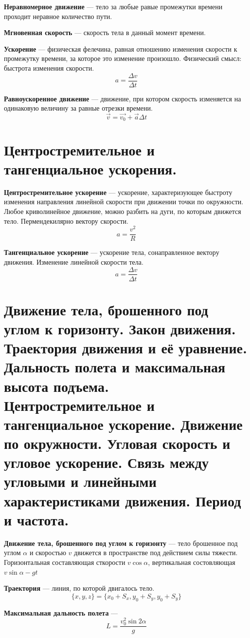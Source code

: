 \documentclass{report}
\begin{document}
{\bf Неравномерное движение} ---
тело за любые равые промежутки времени проходит неравное количество пути.

{\bf Мгновенная скорость} ---
скорость тела в данный момент времени.

{\bf Ускорение} ---
физическая фелечина, равная отношению изменения скорости к промежутку времени, за 
которое это изменение произошло.
Физический смысл: быстрота изменения скорости.
$$
a=\frac{\Delta v}{\Delta t}
$$

{\bf Равноускоренное движение} ---
движение, при котором скорость изменяется на одинаковую величину за равные отрезки времени.
$$
\vec{v}= \vec{v_0}+\vec{a} \Delta t
$$



\part{Центростремительное и тангенциальное ускорения.}

{\bf Центростремительное ускорение} ---
ускорение, характеризующее быстроту изменения направления линейной скорости при 
движении точки по окружности. Любое криволинейное движение, можно разбить на 
дуги, по которым движется тело.
Пермендекилярно вектору скорости.
$$
a=\frac{v^2}{R}
$$

{\bf Тангенциальное ускорение} ---
ускорение тела, сонаправленное вектору движения. Изменение линейной скорости тела.
$$
a=\frac{\Delta v}{\Delta t}
$$




\part{Движение тела, брошенного под углом к горизонту. 
Закон движения. 
Траектория движения и её уравнение. 
Дальность полета и максимальная высота подъема.
Центростремительное и тангенциальное ускорение. 
Движение по окружности. 
Угловая скорость и угловое ускорение. 
Связь между угловыми и линейными характеристиками движения. 
Период и частота.}

{\bf Движение тела, брошенного под углом к горизонту} ---
тело брошенное под углом $\alpha$ и скоростью $v$ движется в пространстве под 
действием силы тяжести.
Горизонтальная составляющая сткорости $v\cos{\alpha}$, вертикальная состовляющая
$v\sin{\alpha}-gt$

{\bf Траектория} ---
линия, по которой двигалось тело.
$$
\{x,y,z\}=\{x_0+S_x, y_0+S_y, y_0+S_y\}
$$

{\bf Максимальная дальность полета} ---
$$
L=\frac{v^2_0\sin{2\alpha}}{g}
$$
\end{document}
